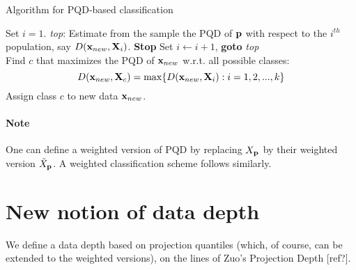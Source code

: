 \documentclass{article}
\begin{document}
\begin{algorithm}[h]
\caption{Algorithm for PQD-based classification}
\begin{algorithmic}[1]
\State Set $i=1$.
\State \emph{top}:
\State Estimate from the sample the PQD of ${\bf{p}}$ with respect to the $i^{th}$ population, say $D({\bf{x}}_{new},{\mathbf{X}}_i)$.
 \textbf{Stop}
	\Else \State Set $i\leftarrow i+1$, \textbf{goto} \emph{top}
\EndIf
\\
\State Find $c$ that maximizes the PQD of ${\bf{x}}_{new}$ w.r.t. all possible classes:
$$ D({\bf{x}}_{new},{\mathbf{X}}_c) = \max\{D({\bf{x}}_{new},{\mathbf{X}}_i): i=1,2,...,k\} $$
\State Assign class $c$ to new data ${\bf{x}}_{new}$.

\EndProcedure
\end{algorithmic}
\end{algorithm}

\paragraph{Note} One can define a weighted version of PQD by replacing $X_{\bf{p}}$ by their weighted version $\tilde X_{\bf{p}}$. A weighted classification scheme follows similarly.


\section*{New notion of data depth}We define a data depth based on projection quantiles (which, of course, can be extended to the weighted versions), on the lines of Zuo's Projection Depth [ref?].
\end{document}
